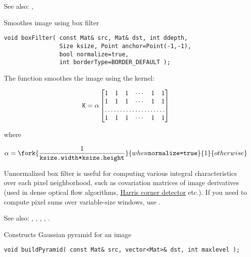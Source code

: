 See also: , 

Smoothes image using box filter

\begin{lstlisting}
void boxFilter( const Mat& src, Mat& dst, int ddepth,
                Size ksize, Point anchor=Point(-1,-1),
                bool normalize=true,
                int borderType=BORDER_DEFAULT );
\end{lstlisting}
\begin{description}
\end{description}

The function smoothes the image using the kernel:

\[ \texttt{K} = \alpha
\begin{bmatrix}
1 & 1 & 1 & \cdots & 1 & 1 \\
1 & 1 & 1 & \cdots & 1 & 1 \\
\hdotsfor{6} \\
1 & 1 & 1 & \cdots & 1 & 1
\end{bmatrix}
\]

where

\[\alpha=\fork
{\frac{1}{\texttt{ksize.width*ksize.height}}}{when \texttt{normalize=true}}
{1}{otherwise} \]

Unnormalized box filter is useful for computing various integral characteristics over each pixel neighborhood, such as covariation matrices of image derivatives (used in dense optical flow algorithms, \hyperref[conerHarris]{Harris corner detector} etc.). If you need to compute pixel sums over variable-size windows, use .

See also: , , , , .

Constructs Gaussian pyramid for an image

\begin{lstlisting}
void buildPyramid( const Mat& src, vector<Mat>& dst, int maxlevel );
\end{lstlisting}
\begin{description}
\end{description}

